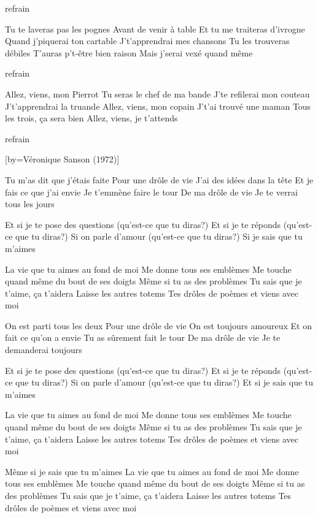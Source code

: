 \beginverse
refrain
\endverse

\beginverse
Tu te laveras pas les pognes
Avant de venir à table
Et tu me traiteras d'ivrogne
Quand j'piquerai ton cartable
J't'apprendrai mes chansons
Tu les trouveras débiles
T'auras p't-être bien raison
Mais j'serai vexé quand même
\endverse

\beginverse
refrain
\endverse

\beginverse
Allez, viens, mon Pierrot
Tu seras le chef de ma bande
J'te refilerai mon couteau
J't'apprendrai la truande
Allez, viens, mon copain
J't'ai trouvé une maman
Tous les trois, ça sera bien
Allez, viens, je t'attends
\endverse

\beginverse
refrain
\endverse

[by={Véronique Sanson (1972)}]

\beginverse
Tu m'as dit que j'étais faite
Pour une drôle de vie
J'ai des idées dans la tête
Et je fais ce que j'ai envie
Je t'emmène faire le tour
De ma drôle de vie
Je te verrai tous les jours
\endverse

\beginverse
Et si je te pose des questions (qu'est-ce que tu diras?)
Et si je te réponds (qu'est-ce que tu diras?)
Si on parle d'amour (qu'est-ce que tu diras?)
Si je sais que tu m'aimes
\endverse

\beginverse
La vie que tu aimes au fond de moi
Me donne tous ses emblèmes
Me touche quand même du bout de ses doigts
Même si tu as des problèmes
Tu sais que je t'aime, ça t'aidera
Laisse les autres totems
Tes drôles de poèmes et viens avec moi
\endverse

\beginverse
On est parti tous les deux
Pour une drôle de vie
On est toujours amoureux
Et on fait ce qu'on a envie
Tu as sûrement fait le tour
De ma drôle de vie
Je te demanderai toujours
\endverse

\beginverse
Et si je te pose des questions (qu'est-ce que tu diras?)
Et si je te réponds (qu'est-ce que tu diras?)
Si on parle d'amour (qu'est-ce que tu diras?)
Et si je sais que tu m'aimes
\endverse

\beginverse
La vie que tu aimes au fond de moi
Me donne tous ses emblèmes
Me touche quand même du bout de ses doigts
Même si tu as des problèmes
Tu sais que je t'aime, ça t'aidera
Laisse les autres totems
Tes drôles de poèmes et viens avec moi
\endverse

\beginverse
Même si je sais que tu m'aimes
La vie que tu aimes au fond de moi
Me donne tous ses emblèmes
Me touche quand même du bout de ses doigts
Même si tu as des problèmes
Tu sais que je t'aime, ça t'aidera
Laisse les autres totems
Tes drôles de poèmes et viens avec moi
\endverse


